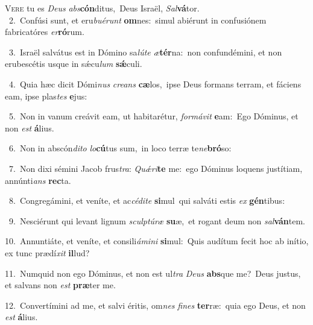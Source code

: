 \lettrine{\initial\textcolor{\initialcolor}{V}}{ere} tu es \textit{De}\-\textit{us} \textit{abs}\-\textbf{cón}ditus,~\star Deus Israël, \textit{Sal}\-\textbf{vá}tor.\\
{\numbfont\textcolor{\numbcolor}{~2.}}~Confúsi sunt, et eru\-\textit{bu}\-\textit{é}\textit{runt} \textbf{om}\-nes:~\star simul abiérunt in confusiónem fabricatóres \textit{er}\-\textbf{ró}rum.\par
{\numbfont\textcolor{\numbcolor}{~3.}}~Israël salvátus est in Dómino sa\-\textit{lú}\-\textit{te} \textit{æ}\-\textbf{tér}na:~\star non confundémini, et non erubescétis usque in sǽcu\textit{lum} \textbf{sǽ}\-culi.\par
{\numbfont\textcolor{\numbcolor}{~4.}}~Quia hæc dicit Dómi\textit{nus} \textit{cre}\-\textit{ans} \textbf{cæ}\-los,~\star ipse Deus formans terram, et fáciens eam, ipse plas\textit{tes} \textbf{e}\-jus:\par
{\numbfont\textcolor{\numbcolor}{~5.}}~Non in vanum creávit eam, ut habitarétur, \textit{for}\-\textit{má}\textit{vit} \textbf{e}\-am:~\star Ego Dóminus, et non \textit{est} \textbf{á}\-lius.\par
{\numbfont\textcolor{\numbcolor}{~6.}}~Non in abscón\-\textit{di}\-\textit{to} \textit{lo}\-\textbf{cú}tus sum,~\star in loco terræ te\-\textit{ne}\-\textbf{bró}so:\par
{\numbfont\textcolor{\numbcolor}{~7.}}~Non dixi sémini Jacob frus\-\textit{tra}\-: \textit{Quǽ}\-\textit{ri}\textbf{te} me:~\star ego Dóminus loquens justítiam, annúnti\textit{ans} \textbf{rec}\-ta.\par
{\numbfont\textcolor{\numbcolor}{~8.}}~Congregámini, et veníte, et ac\-\textit{cé}\-\textit{di}\textit{te} \textbf{si}\-mul~\star qui salváti estis \textit{ex} \textbf{gén}\-tibus:\par
{\numbfont\textcolor{\numbcolor}{~9.}}~Nesciérunt qui levant lignum \textit{sculp}\-\textit{tú}\textit{ræ} \textbf{su}\-æ,~\star et rogant deum non \textit{sal}\-\textbf{ván}tem.\par
{\numbfont\textcolor{\numbcolor}{10.}}~Annuntiáte, et veníte, et consili\-\textit{á}\-\textit{mi}\textit{ni} \textbf{si}\-mul:~\star Quis audítum fecit hoc ab inítio, ex tunc prædí\textit{xit} \textbf{il}\-lud?\par
{\numbfont\textcolor{\numbcolor}{11.}}~Numquid non ego Dóminus, et non est ul\textit{tra} \textit{De}\-\textit{us} \textbf{abs}\-que me?~\star Deus justus, et salvans non \textit{est} \textbf{præ}\-ter me.\par
{\numbfont\textcolor{\numbcolor}{12.}}~Convertímini ad me, et salvi éritis, om\textit{nes} \textit{fi}\-\textit{nes} \textbf{ter}\-ræ:~\star quia ego Deus, et non \textit{est} \textbf{á}\-lius.\par
